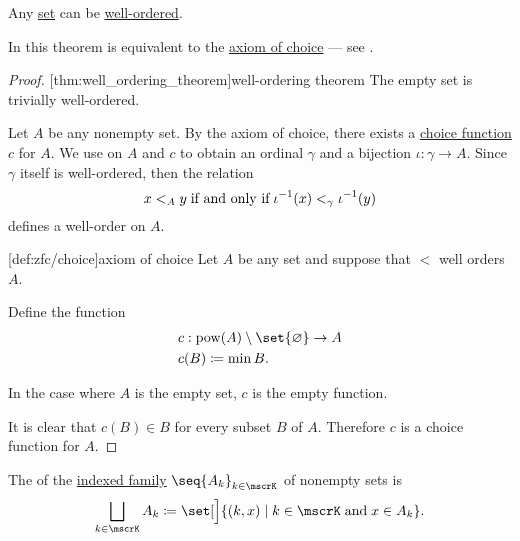 \begin{theorem}\label{thm:well_ordering_theorem}
  Any \hyperref[def:set]{set} can be \hyperref[def:well_ordered_set]{well-ordered}.

  In \hyperref[def:zfc]{} this theorem is equivalent to the \hyperref[def:zfc/choice]{axiom of choice} --- see .
\end{theorem}
\begin{proof}
  [thm:well_ordering_theorem]{well-ordering theorem} The empty set is trivially well-ordered.

  Let \( A \) be any nonempty set. By the axiom of choice, there exists a \hyperref[def:choice_function]{choice function} \( c \) for \( A \). We use  on \( A \) and \( c \) to obtain an ordinal \( \gamma \) and a bijection \( \iota: \gamma \to A \). Since \( \gamma \) itself is well-ordered, then the relation
  \begin{equation*}
    x <_A y \T{if and only if} \iota^{-1}(x) <_\gamma \iota^{-1}(y)
  \end{equation*}
  defines a well-order on \( A \).

  [def:zfc/choice]{axiom of choice} Let \( A \) be any set and suppose that \( < \) well orders \( A \).

  Define the function
  \begin{equation*}
    \begin{aligned}
      &c: \pow(A) \setminus \set{ \varnothing } \to A \\
      &c(B) \coloneqq \min B.
    \end{aligned}
  \end{equation*}

  In the case where \( A \) is the empty set, \( c \) is the empty function.

  It is clear that \( c(B) \in B \) for every subset \( B \) of \( A \). Therefore \( c \) is a choice function for \( A \).
\end{proof}

\begin{definition}\label{def:disjoint_union}
  The  of the \hyperref[def:indexed_family]{indexed family} \( \seq{ A_k }_{k \in \mscrK} \) of nonempty sets is
  \begin{equation*}
    \bigsqcup_{k \in \mscrK} A_k \coloneqq \set[\Big]{ (k, x) \given k \in \mscrK \T{and} x \in A_k }.
  \end{equation*}
\end{definition}

